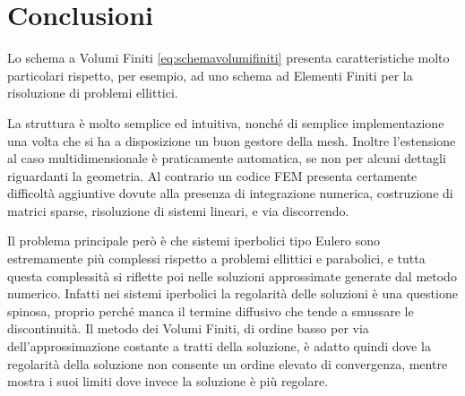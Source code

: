 \section{Conclusioni}
Lo schema a Volumi Finiti \eqref{eq:schemavolumifiniti} presenta caratteristiche molto particolari rispetto, per esempio, ad uno schema ad Elementi Finiti per la risoluzione di problemi ellittici.

La struttura è molto semplice ed intuitiva, nonché di semplice implementazione una volta che si ha a disposizione un buon gestore della mesh. Inoltre l'estensione al caso multidimensionale è praticamente automatica, se non per alcuni dettagli riguardanti la geometria. Al contrario un codice FEM presenta certamente difficoltà aggiuntive dovute alla presenza di integrazione numerica, costruzione di matrici sparse, risoluzione di sistemi lineari, e via discorrendo.

Il problema principale però è che sistemi iperbolici tipo Eulero sono estremamente più complessi rispetto a problemi ellittici e parabolici, e tutta questa complessità si riflette poi nelle soluzioni approssimate generate dal metodo numerico. Infatti nei sistemi iperbolici la regolarità delle soluzioni è una questione spinosa, proprio perché manca il termine diffusivo che tende a smussare le discontinuità. Il metodo dei Volumi Finiti, di ordine basso per via dell'approssimazione costante a tratti della soluzione, è adatto quindi dove la regolarità della soluzione non consente un ordine elevato di convergenza, mentre mostra i suoi limiti dove invece la soluzione è più regolare.

